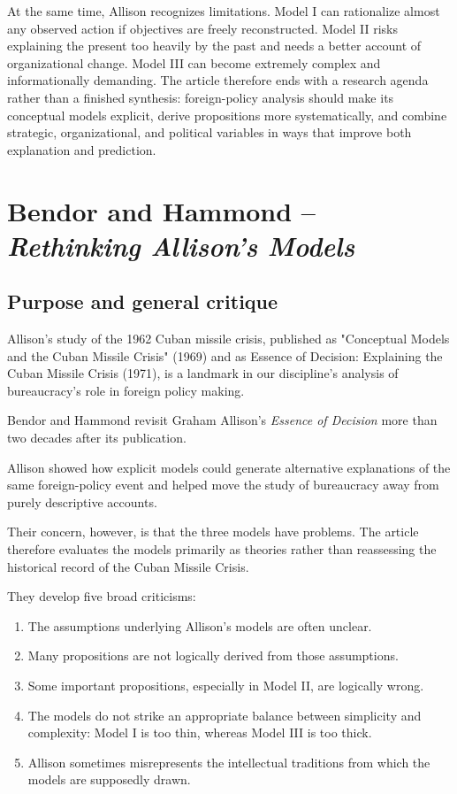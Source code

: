 At the same time, Allison recognizes limitations. Model I can rationalize almost any observed action if objectives are freely reconstructed. Model II risks explaining the present too heavily by the past and needs a better account of organizational change. Model III can become extremely complex and informationally demanding. The article therefore ends with a research agenda rather than a finished synthesis: foreign-policy analysis should make its conceptual models explicit, derive propositions more systematically, and combine strategic, organizational, and political variables in ways that improve both explanation and prediction.

\clearpage
\section{Bendor and Hammond -- \emph{Rethinking Allison's Models}}

\subsection{Purpose and general critique}

Allison's study of the 1962 Cuban missile crisis, published as "Conceptual Models and the Cuban Missile Crisis" (1969) and as Essence of Decision: Explaining the Cuban Missile Crisis (1971), is a landmark in our discipline's analysis of bureaucracy's role in foreign policy making.

Bendor and Hammond revisit Graham Allison's \emph{Essence of Decision} more than two decades after its publication.

Allison showed how explicit models could generate alternative explanations of the same foreign-policy event and helped move the study of bureaucracy away from purely descriptive accounts.

Their concern, however, is that the three models have problems. The article therefore evaluates the models primarily as theories rather than reassessing the historical record of the Cuban Missile Crisis.

They develop five broad criticisms:
\begin{enumerate}
    \item The assumptions underlying Allison's models are often unclear.

    \item Many propositions are not logically derived from those assumptions.

    \item Some important propositions, especially in Model II, are logically wrong.

    \item The models do not strike an appropriate balance between simplicity and complexity: Model I is too thin, whereas Model III is too thick.

    \item Allison sometimes misrepresents the intellectual traditions from which the models are supposedly drawn.
\end{enumerate}

